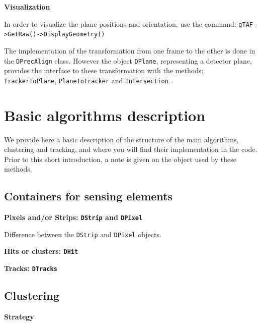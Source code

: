 \documentclass[a4paper, 12pt, twoside]{article}
\begin{document}
\vspace{0.8 cm}

\noindent
{\bf Visualization}

\noindent
In order to visualize the plane positions and orientation, use the command:
{\tt gTAF->GetRaw()->DisplayGeometry()}

\noindent
The implementation of the transformation from one frame to the other is done in the {\tt DPrecAlign} class. However the object {\tt DPlane}, representing a detector plane, provides the interface to these transformation with the methods:
{\tt TrackerToPlane}, {\tt PlaneToTracker} and {\tt Intersection}.


\vspace{2cm}

\section{Basic algorithms description}
\label{secAlgorithms}

We provide here a basic description of the structure of the main algorithms, clustering and tracking, and where you will find their implementation in the code. Prior to this short introduction, a note is given on the object used by these methods.

\subsection{Containers for sensing elements}
\label{subsecElements}

\noindent
{\bf Pixels and/or Strips: {\tt DStrip} and {\tt DPixel}}

Difference between the {\tt DStrip} and {\tt DPixel} objects.

\vspace{.8cm}


\noindent
{\bf Hits or clusters: {\tt DHit}}


\vspace{.8cm}


\noindent
{\bf Tracks: {\tt DTracks}}


\vspace{.8cm}



\subsection{Clustering}

\noindent
{\bf Strategy}
\end{document}
